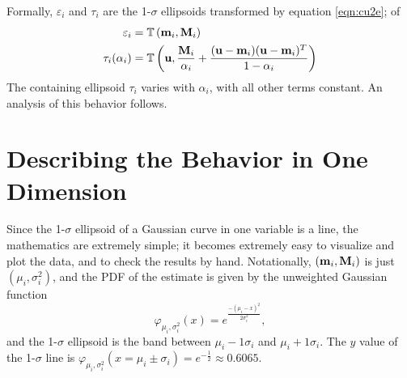 Formally, $\varepsilon_i$ and $\tau_i$ are the 1-$\sigma$ ellipsoids transformed by equation \ref{eqn:cu2e}; of
\begin{align}
    \displaystyle
    \varepsilon_i    &= \mathbb{T}\left(\mathbf{m}_i,\mathbf{M}_i\right)\label{eqn:coveps}\\
    \tau_i(\alpha_i) &=
\mathbb{T}\left(\mathbf{u},\frac{\mathbf{M}_i}{\alpha_i}+\frac{(\mathbf{u}-\mathbf{m}_i)(\mathbf{u}-\mathbf{m}_i)^T}{1-\alpha_i}\right)\label{eqn:covtau}
\end{align}
The containing ellipsoid $\tau_i$ varies with $\alpha_i$, with all other terms constant. An analysis of this behavior
follows.


\section{Describing the Behavior in One Dimension}

Since the 1-$\sigma$ ellipsoid of a Gaussian curve in one variable is a line, the mathematics are extremely simple; it
becomes extremely easy to visualize and plot the data, and to check the results by hand. Notationally,
$(\mathbf{m}_i,\mathbf{M}_i)$ is just $(\mu_i,\sigma_i^2)$, and the PDF of the estimate is given by the unweighted Gaussian
function
\begin{equation}\label{eqn:gauss1d}
    \varphi_{\mu_i,\sigma_i^2}(x)=e^\frac{-(\mu_i-x)^2}{2\sigma_i^2}, \end{equation}
and the 1-$\sigma$ ellipsoid is the band between $\mu_i-1\sigma_i$ and $\mu_i+1\sigma_i$. The $y$ value of the
1-$\sigma$ line is $\varphi_{\mu_i,\sigma_i^2}(x=\mu_i\pm\sigma_i)=e^{-\frac{1}{2}}\approx0.6065$.

